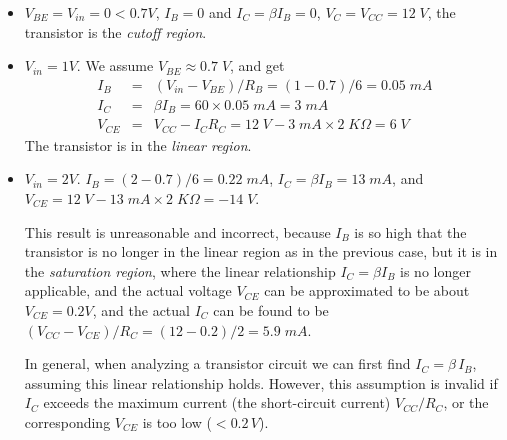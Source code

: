 \documentclass{article}
\begin{document}
\begin{itemize}
\item $V_{BE}=V_{in}=0<0.7V$, $I_B=0$ and $I_C=\beta I_B=0$, $V_C=V_{CC}=12\;V$,
  the transistor is the {\em cutoff region}.

\item $V_{in}=1V$.   We assume $V_{BE}\approx 0.7\;V$, and get 
  \begin{eqnarray}
    I_B&=&(V_{in}-V_{BE})/R_B=(1-0.7)/6=0.05\;mA 
    \nonumber\\
    I_C&=&\beta I_B=60\times 0.05\;mA=3\; mA 
    \nonumber\\
    V_{CE}&=&V_{CC}-I_C R_C=12\;V-3\;mA \times 2\;K\Omega=6\;V
  \end{eqnarray}
  The transistor is in the {\em linear region}.
 

\item $V_{in}=2V$. $I_B=(2-0.7)/6=0.22\;mA$, $I_C=\beta I_B=13\;mA$, and 
  $V_{CE}=12\;V-13\;mA\times 2\;K\Omega=-14\;V$.

  This result is unreasonable and incorrect, because $I_B$ is so high 
  that the transistor is no longer in the linear region as in the previous
  case, but it is in the {\em saturation region}, where the linear relationship 
  $I_C=\beta I_B$ is no longer applicable, and the actual voltage $V_{CE}$ can
  be approximated to be about $V_{CE}=0.2V$, and the actual $I_C$ can be found 
  to be $(V_{CC}-V_{CE})/R_C=(12-0.2)/2=5.9\;mA$.

  In general, when analyzing a transistor circuit we can first find
  $I_C=\beta\,I_B$, assuming this linear relationship holds. However,
  this assumption is invalid if $I_C$ exceeds the maximum current (the 
  short-circuit current) $V_{CC}/R_C$, or the corresponding $V_{CE}$ is 
  too low ($<0.2\,V$).

\end{itemize}
\end{document}
